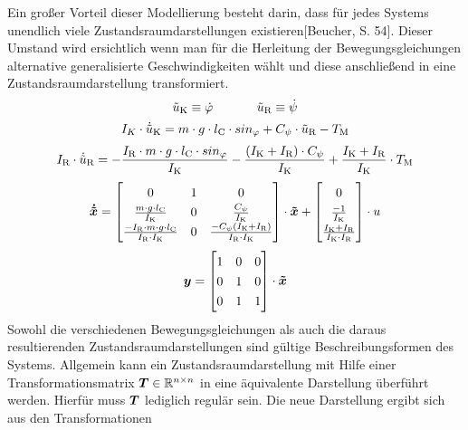 Ein großer Vorteil dieser Modellierung besteht darin, dass für jedes Systems unendlich viele Zustandsraumdarstellungen existieren[Beucher, S. 54]. Dieser Umstand wird ersichtlich wenn man für die Herleitung der Bewegungsgleichungen alternative generalisierte Geschwindigkeiten wählt und diese anschließend in eine Zustandsraumdarstellung transformiert.
\begin{equation}
\tilde{u}_{\text{K}} \equiv \dot{\varphi} \hspace{35pt} \tilde{u}_{\text{R}} \equiv \dot{\psi}
\end{equation}
\begin{equation}
I_K\cdot \dot{\tilde{u}}_{\text{K}} = m\cdot g \cdot l_{\text{C}} \cdot sin_{\varphi} + C_{\psi}\cdot \tilde{u}_{\text{R}} - T_{\text{M}}
\end{equation}
\begin{equation}
I_{\text{R}}\cdot \dot{\tilde{u}}_{\text{R}} = -\frac{I_{\text{R}}\cdot m\cdot g\cdot l_{\text{C}}\cdot sin_{\varphi}}{I_{\text{K}}} - \frac{(I_{\text{K}} + I_{\text{R}})\cdot C_{\psi}}{I_{\text{K}}} + \frac{I_{\text{K}} + I_{\text{R}}}{I_{\text{K}}}\cdot T_{\text{M}}
\end{equation}
\begin{equation}
\renewcommand*{\arraystretch}{1.3}
\bs{\dot{\tilde{x}}} = \begin{bmatrix}
0 & 1 & 0 
\\
\frac{m\cdot g\cdot l\idx{C}}{I\idx{K}} & 0 & \frac{C_{\psi}}{I\idx{K}}
\\
\frac{-I\idx{R}\cdot m\cdot g\cdot l\idx{C}}{I\idx{R}\cdot I\idx{K}} & 0 & \frac{-C_{\psi}(I\idx{K}+I\idx{R})}{I\idx{R}\cdot I\idx{K}} 
\end{bmatrix}\cdot \bs{\tilde{x}}
+
\begin{bmatrix}
0 \\ \frac{-1}{I\idx{K}} \\ \frac{I\idx{K}+I\idx{R}}{I\idx{K}\cdot I\idx{R}}
\end{bmatrix} \cdot u
\end{equation}
\begin{equation}
\bs{y} = \begin{bmatrix}
1 & 0 & 0 \\
0 & 1 & 0 \\
0 & 1 & 1 \\
\end{bmatrix} \cdot \bs{\tilde{x}}
\end{equation}
Sowohl die verschiedenen Bewegungsgleichungen als auch die daraus resultierenden Zustandsraumdarstellungen sind gültige Beschreibungsformen des Systems. Allgemein kann ein Zustandsraumdarstellung mit Hilfe einer Transformationsmatrix $\boldsymbol{T} \in \mathbb{R}^{n\times n}$ in eine äquivalente Darstellung überführt werden. Hierfür muss $\boldsymbol{T}$ lediglich regulär sein. Die neue Darstellung ergibt sich aus den Transformationen
